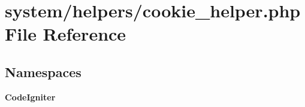 \section{system/helpers/cookie\-\_\-helper.php File Reference}
\label{cookie__helper_8php}
\subsection*{Namespaces}
\begin{DoxyCompactItemize}
\item 
{\bf Code\-Igniter}
\end{DoxyCompactItemize}
